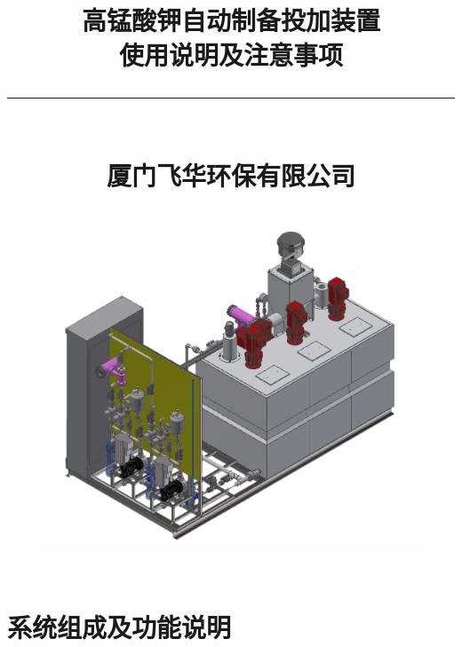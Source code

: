 \documentclass[UTF8,a4paper,12pt,titlepage]{ctexart}
\begin{document}
\title{
    高锰酸钾自动制备投加装置\\[2.5mm]
    使用说明及注意事项\\
   {\noindent}\rule{16cm}{1pt}\\[3mm]
    厦门飞华环保有限公司\\
   \begin{figure}[h]
      \centering
      \includegraphics[height=10cm]{g000.PNG}
   \end{figure}
}

\maketitle %

\tableofcontents %

\newpage %

\section{系统组成及功能说明}
\end{document}
